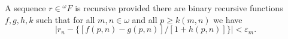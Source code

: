 A sequence $r \in {}^\omega F$ is recursive provided there are binary recursive functions $f, g, h, k$ such that for all $m, n \in \omega$ and all $p \geq k(m, n)$ we have
$$|r_n - \{[f(p, n) - g(p, n)] / [1 + h(p, n)]\}| < \varepsilon_m.$$
